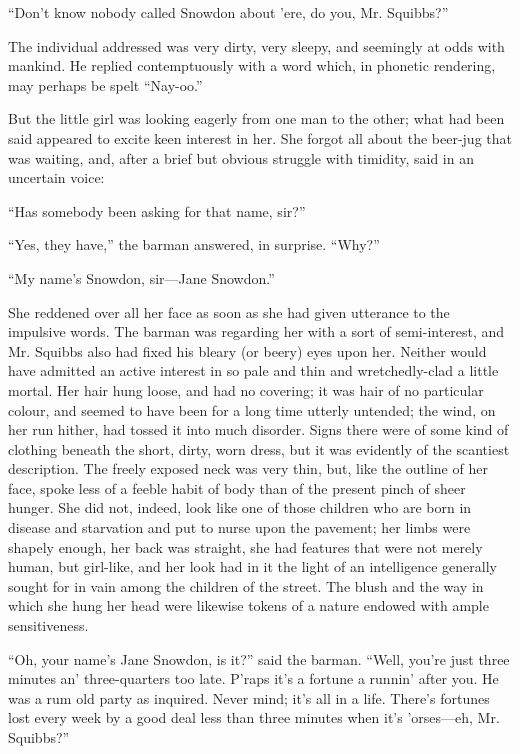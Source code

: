 ``Don't know nobody called Snowdon about 'ere, do you, Mr. Squibbs?''

The individual addressed was very dirty, very sleepy, and seemingly at
odds with mankind. He replied contemptuously with a word which, in
phonetic rendering, may perhaps be spelt ``Nay-oo.''

But the little girl was looking eagerly from one man to the other; what
had been said appeared to excite keen interest in her. She forgot all
about the beer-jug that was waiting, and, after a brief but obvious
struggle with timidity, said in an uncertain voice:

{\protect\hypertarget{7}{}{}}``Has somebody been asking for that name,
sir?''

``Yes, they have,'' the barman answered, in surprise. ``Why?''

``My name's Snowdon, sir---Jane Snowdon.''

She reddened over all her face as soon as she had given utterance to the
impulsive words. The barman was regarding her with a sort of
semi-interest, and Mr. Squibbs also had fixed his bleary (or beery) eyes
upon her. Neither would have admitted an active interest in so pale and
thin and wretchedly-clad a little mortal. Her hair hung loose, and had
no covering; it was hair of no particular colour, and seemed to have
been for a long time utterly untended; the wind, on her run hither, had
tossed it into much disorder. Signs there were of some kind of clothing
beneath the short, dirty, worn dress, but it was evidently of the
scantiest description. The freely exposed neck was very thin, but, like
the outline of her face, spoke less of a feeble habit of body than of
the present pinch of sheer hunger. She did not, indeed,
{\protect\hypertarget{8}{}{}}look like one of those children who are
born in disease and starvation and put to nurse upon the pavement; her
limbs were shapely enough, her back was straight, she had features that
were not merely human, but girl-like, and her look had in it the light
of an intelligence generally sought for in vain among the children of
the street. The blush and the way in which she hung her head were
likewise tokens of a nature endowed with ample sensitiveness.

``Oh, your name's Jane Snowdon, is it?'' said the barman. ``Well, you're
just three minutes an' three-quarters too late. P'raps it's a fortune a
runnin' after you. He was a rum old party as inquired. Never mind; it's
all in a life. There's fortunes lost every week by a good deal less than
three minutes when it's 'orses---eh, Mr. Squibbs?''


